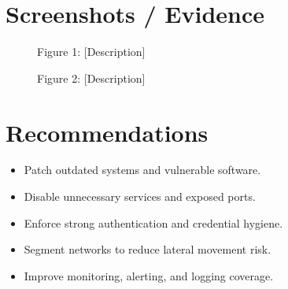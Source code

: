 \documentclass[11pt]{article}
\begin{document}
\section{Screenshots / Evidence}

\begin{figure}[htbp]
\centering
\caption{Figure 1: [Description]}
\label{fig:one}
\end{figure}

\begin{figure}[htbp]
\centering
\caption{Figure 2: [Description]}
\label{fig:two}
\end{figure}

\section{Recommendations}

\begin{itemize}
  \item Patch outdated systems and vulnerable software.
  \item Disable unnecessary services and exposed ports.
  \item Enforce strong authentication and credential hygiene.
  \item Segment networks to reduce lateral movement risk.
  \item Improve monitoring, alerting, and logging coverage.
\end{itemize}
\end{document}
